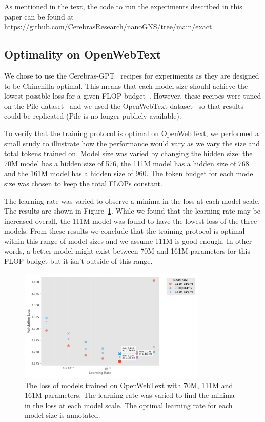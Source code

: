 \documentclass{article}
\begin{document}
As mentioned in the text, the code to run the experiments described in this paper
can be found at \url{https://github.com/CerebrasResearch/nanoGNS/tree/main/exact}.

\subsection{Optimality on OpenWebText}\label{optimal}

We chose to use the Cerebras-GPT~\citep{dey2023cerebrasgpt} recipes for
experiments as they are designed to be Chinchilla optimal. This means that each
model size should achieve the lowest possible loss for a given FLOP
budget~\citep{hoffmann2022training}. However, these recipes were tuned on the
Pile dataset~\citep{gao2020pile} and we used the OpenWebText dataset~\citep{gokaslan2019owt}
so that results could be replicated (Pile is no longer publicly available).

To verify that the training protocol is optimal on OpenWebText, we performed
a small study to illustrate how the performance would vary as we vary the size
and total tokens trained on. Model size was varied by changing the hidden size:
the 70M model has a hidden size of 576, the 111M model has a hidden size of 768
and the 161M model has a hidden size of 960. The token budget for each model
size was chosen to keep the total FLOPs constant.

The learning rate was varied to observe a minima in the loss at each model
scale. The results are shown in
Figure~\ref{fig:owt_optimal}. While we found that the learning rate may be
increased overall, the 111M model was found to have the lowest loss of the three
models. From these results we conclude that the training protocol is optimal
within this range of model sizes and we assume 111M is good enough. In other
words, a better model might exist between 70M and 161M parameters for this FLOP
budget but it isn't outside of this range.

\begin{figure}
    \centering
    \includegraphics[width=0.8\textwidth]{figures/owt_optimality.pdf}
    \caption{%
        The loss of models trained on OpenWebText with 70M, 111M and 161M
        parameters. The learning rate was varied to find the minima in the loss
        at each model scale. The optimal learning rate for each model size
        is annotated.}
    \label{fig:owt_optimal}
\end{figure}
\end{document}
